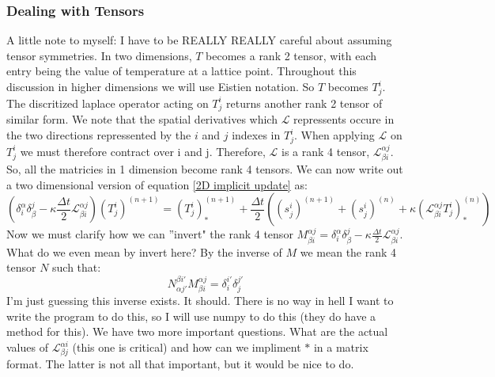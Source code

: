 \documentclass{article}
\begin{document}
\subsubsection*{Dealing with Tensors}
A little note to myself:
\newline
I have to be REALLY REALLY careful about assuming tensor symmetries.
\newline
In two dimensions, $T$ becomes a rank 2 tensor, with each entry being the value of temperature at a lattice point. Throughout this discussion in higher dimensions we will use Eistien notation. So $T$ becomes $T^{i}_{j}$. The discritized laplace operator acting on $T^{i}_{j}$ returns another rank 2 tensor of similar form. We note that the spatial derivatives which $\mathcal{L}$ repressents occure in the two directions repressented by the $i$ and $j$ indexes in $T^{i}_{j}$. When applying $\mathcal{L}$ on $T^{i}_{j}$ we must therefore contract over i and j. Therefore, $\mathcal{L}$ is a rank 4 tensor, $\mathcal{L}^{\alpha j}_{\beta i}$. So, all the matricies in 1 dimension become rank 4 tensors. We can now write out a two dimensional version of equation \ref{2D implicit update} as:
\begin{equation}
	(  \delta^{\alpha}_{i} \delta^{j}_{\beta}- \kappa \frac{\Delta t}{2} \mathcal{L}^{\alpha j}_{\beta i}) (T^{i}_{j})^{(n+1)} = (T^{i}_{j})^{(n+1)}_{*} + \frac{\Delta t}{2} ( (s^{i}_{j})^{(n+1)} + (s^{i}_{j})^{(n)} + \kappa ( \mathcal{L}^{\alpha j}_{\beta i} T^{i}_{j} )^{(n)}_{*} )
\end{equation}
Now we must clarify how we can ''invert" the rank 4 tensor $M^{\alpha j}_{\beta i}  =  \delta^{\alpha}_{i} \delta^{j}_{\beta}- \kappa \frac{\Delta t}{2} \mathcal{L}^{\alpha j}_{\beta i}$. What do we even mean by invert here? By the inverse of $M$ we mean the rank 4 tensor $N$ such that:
\begin{equation}
	N^{\beta i'}_{\alpha j'} M^{\alpha j}_{\beta i} = \delta^{i'}_{i} \delta^{j'}_{j}
\end{equation}
I'm just guessing this inverse exists. It should. There is no way in hell I want to write the program to do this, so I will use numpy to do this (they do have a method for this).
\vspace{4 cm}
We have two more important questions. What are the actual values of $\mathcal{L}^{\alpha i}_{\beta j}$ (this one is critical) and how can we impliment $*$ in a matrix format. The latter is not all that important, but it would be nice to do. 
\end{document}
